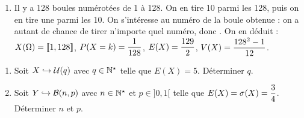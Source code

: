 \documentclass[a4paper, 11pt,reqno]{article}
\begin{document}
\begin{correction}
\begin{enumerate}
		\item Il y a 128 boules num\'erot\'ees de 1 \`a 128. On en tire 10 parmi les 128, puis on en tire une parmi les 10. On s'int\'eresse au num\'ero de la boule obtenue : on a autant de chance de tirer n'importe quel num\'ero, donc . On en d\'eduit : $X(\Omega) = \llbracket  1,128 \rrbracket$, $P(X=k) = \displaystyle \frac{1}{128}$,  $E(X) =\displaystyle \frac{129}{2}$, $V(X) = \displaystyle \frac{128^2-1}{12}$.
	\end{enumerate}
\end{correction}







\begin{exercice}  \;
	\begin{enumerate}
		\item Soit $X\hookrightarrow \mathcal{U}(q)$ avec $q\in\mathbb{N}^{\star}$ telle que $E(X)=5$. D\'eterminer $q$.
		\item Soit $Y\hookrightarrow \mathcal{B}(n,p)$ avec $n\in\mathbb{N}^{\star}$ et $p\in\rbrack 0,1\lbrack$ telle que $E(X)=\sigma (X)=\displaystyle\frac{3}{4}$. D\'eterminer $n$ et $p$.
	\end{enumerate}
\end{exercice}
\end{document}
